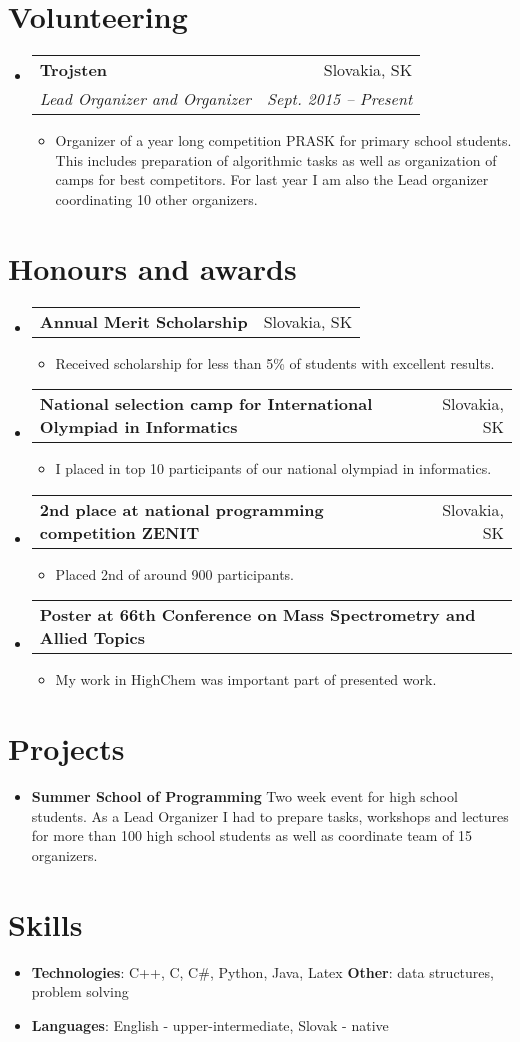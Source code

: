 \documentclass[letterpaper,11pt]{article}
\makeatletter
\newcommand{\resumeItem}[2]{
  \item\small{
    \textbf{#1}{#2 \vspace{-2pt}}
  }
}
\newcommand{\resumeSubheading}[4]{
  \vspace{-1pt}\item
    \begin{tabular*}{0.97\textwidth}{l@{\extracolsep{\fill}}r}
      \textbf{#1} & #2 \\
      \textit{\small#3} & \textit{\small #4} \\
    \end{tabular*}\vspace{-5pt}
}
\newcommand{\resumeSubheadingMY}[4]{
  \vspace{-1pt}\item
    \begin{tabular*}{0.97\textwidth}{l@{\extracolsep{\fill}}r}
      \textbf{#1} & #2 \\
    \end{tabular*}\vspace{-5pt}
}
\newcommand{\resumeSubItem}[2]{\resumeItem{#1}{#2}\vspace{-4pt}}
\newcommand{\resumeSubHeadingListStart}{\begin{itemize}[leftmargin=*]}
\newcommand{\resumeSubHeadingListEnd}{\end{itemize}}
\newcommand{\resumeItemListStart}{\begin{itemize}}
\newcommand{\resumeItemListEnd}{\end{itemize}\vspace{-5pt}}
\makeatother
\begin{document}
\section{Volunteering}
  \resumeSubHeadingListStart
    \resumeSubheading
      {Trojsten}{Slovakia, SK}
      {Lead Organizer and Organizer}{Sept. 2015 -- Present}
      \resumeItemListStart
        \resumeItem{}
          {Organizer of a year long competition PRASK for primary school students. This includes preparation of algorithmic tasks as well as organization of camps for best competitors. For last year I am also the Lead organizer coordinating 10 other organizers.}
      \resumeItemListEnd
  \resumeSubHeadingListEnd
  
 \section{Honours and awards}
  \resumeSubHeadingListStart
    \resumeSubheadingMY
      {Annual Merit Scholarship}{Slovakia, SK}
      {}{}
      \resumeItemListStart
        \resumeItem{}
          {Received scholarship for less than 5\% of students with excellent results.}
      \resumeItemListEnd
    \resumeSubheadingMY
      {National selection camp for International Olympiad in Informatics}{Slovakia, SK}
      {}{}
      \resumeItemListStart
        \resumeItem{}
          {I placed in top 10 participants of our national olympiad in informatics.}
      \resumeItemListEnd
     \resumeSubheadingMY
      {2nd place at national programming competition ZENIT}{Slovakia, SK}
      {}{}
      \resumeItemListStart
        \resumeItem{}
          {Placed 2nd of around 900 participants.}
      \resumeItemListEnd 
      \resumeSubheadingMY
      {Poster at 66th Conference on Mass Spectrometry and Allied Topics}{}
      {}{}
      \resumeItemListStart
        \resumeItem{}
          {My work in HighChem was important part of presented work.}
      \resumeItemListEnd
      
  \resumeSubHeadingListEnd

\section{Projects}
  \resumeSubHeadingListStart
    \resumeSubItem{Summer School of Programming}
      { Two week event for high school students. As a Lead Organizer I had to prepare tasks, workshops and lectures for more than 100 high school students as well as coordinate team of 15 organizers.}
  \resumeSubHeadingListEnd

%
\section{Skills}
 \resumeSubHeadingListStart
   \item{
     \textbf{Technologies}{: C++, C, C\#, Python, Java, Latex}
     \hfill
     \textbf{Other}{: data structures, problem solving}
   }
   \item{
    \textbf{Languages}{: English - upper-intermediate, Slovak - native}
   }
 \resumeSubHeadingListEnd


\end{document}
